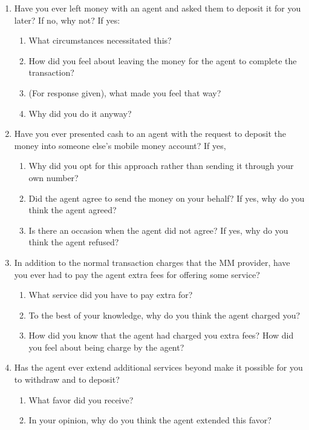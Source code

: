 \begin{appendices}
\begin{enumerate}
    \item Have you ever left money with an agent and asked them to deposit it for you later? If no, why not? If yes:
    \begin{enumerate}
        \item What circumstances necessitated this? 
        \item How did you feel about leaving the money for the agent to complete the transaction?
        \item (For response given), what made  you feel that way?
        \item Why did you do it anyway?
    \end{enumerate}

    \item Have you ever presented cash to an agent with the request to deposit the money into someone else’s mobile money account? If yes, 
    \begin{enumerate}
        \item Why did you opt for this approach rather than sending it through your own number?
        \item Did the agent agree to send the money on your behalf? If yes, why do you think the agent agreed?
        \item Is there an occasion when the agent did not agree? If yes, why do you think the agent refused?
    \end{enumerate}

     \item In addition to the normal transaction charges that the MM provider, have you ever had to pay the agent extra fees for offering some service?
     \begin{enumerate}
        \item What service did you have to pay extra for?
        \item To the best of your knowledge, why do you think the agent charged you?
        \item How did you know that the agent had charged you extra fees? How did you feel about being charge by the agent?
    \end{enumerate}
   \item Has the agent ever extend additional services beyond make it possible for you to withdraw and to deposit? 
    \begin{enumerate}
        \item What favor did you receive?
        \item In your opinion, why do you think the agent extended this favor?
    \end{enumerate}


\end{enumerate}
\end{appendices}

